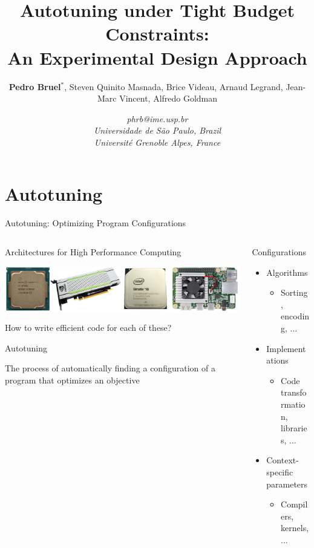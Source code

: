 \documentclass[10pt, compress, aspectratio=169, xcolor={table,usenames,dvipsnames}]{beamer}
\author{ \footnotesize \textbf{\alert{Pedro Bruel$^{*}$}},  Steven Quinito Masnada, Brice Videau, Arnaud Legrand, Jean-Marc Vincent, Alfredo Goldman}
\date{ \scriptsize \textit{phrb@ime.usp.br} \\[1em] \textit{Universidade de São Paulo, Brazil} \\ \textit{Université Grenoble Alpes, France}}
\title{Autotuning under Tight Budget Constraints:  \\ An Experimental Design Approach}
\begin{document}
\maketitle

\section{Autotuning}
\label{sec:org0850821}
\begin{frame}[label={sec:orgab172d6}]{Autotuning: Optimizing Program Configurations}
\begin{columns}
\begin{column}{0.5\columnwidth}
\begin{block}{Architectures for High Performance Computing}
\begin{center}
\includegraphics[width=\columnwidth]{../../../img/architectures_2.png}
\end{center}

How to write \alert{efficient code} for each of these?

\begin{block}{Autotuning}
\vspace{.2cm}

The process of automatically finding a \mbox{\alert{configuration}} of a program
that optimizes an \mbox{\alert{objective}}
\end{block}
\end{block}
\end{column}

\begin{column}{0.5\columnwidth}
\begin{block}{Configurations}
\begin{itemize}
\item Algorithms
\begin{itemize}
\item Sorting, encoding, \(\dots\)
\end{itemize}
\item Implementations
\begin{itemize}
\item Code transformation, libraries, \(\dots\)
\end{itemize}
\item Context-specific parameters
\begin{itemize}
\item Compilers, kernels, \(\dots\)
\end{itemize}
\end{itemize}


\end{block}
\end{column}
\end{columns}
\end{frame}
\end{document}
